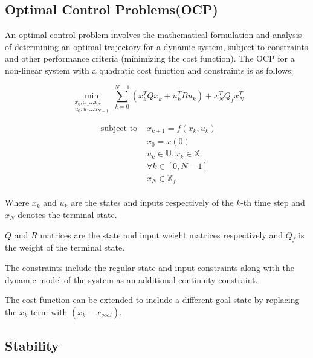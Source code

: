 \clearpage

\subsection{Optimal Control Problems(OCP)}
An optimal control problem involves the mathematical formulation and analysis of determining an optimal trajectory for a dynamic system, subject to constraints and other performance criteria (minimizing the cost function). The OCP for a non-linear system with a quadratic cost function and constraints is as follows: 

\begin{equation}
\underset{\substack{x_0,x_1...x_N \\ u_0,u_1...u_{N-1}}} {\operatorname{min}} \sum_{k=0}^{N-1}\left (x_{k}^{T} Q x_{k}+ u_{k}^{T} R u_{k}\right)+x_{N}^{T} Q_f x_{N}^{T}
\end{equation}

\begin{equation}
\begin{array}{ll}
\text { subject to } & x_{k+1} = f(x_k,u_k)  \\
& x_0 = x(0) \\

& u_k \in \mathbb{U}, x_k \in \mathbb{X} \\

& \forall k \in[0, N-1] \\

& x_N \in \mathbb{X}_f \\
\end{array}
\end{equation}

Where $x_k$ and $u_k$ are the states and inputs respectively of the $k$-th time step and $x_N$ denotes the terminal state.

$Q$ and $R$ matrices are the state and input weight matrices respectively and $Q_f$ is the weight of the terminal state.

 

The constraints include the regular state and input constraints along with the dynamic model of the system as an additional continuity constraint. 

The cost function can be extended to include a different goal state by replacing the $x_k$ term with $(x_k - x_{goal})$.

\subsection{Stability}

